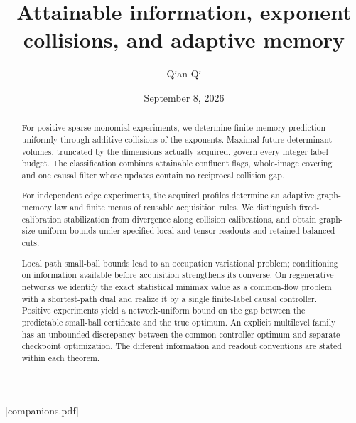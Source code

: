 
\providecommand{\upref}[2]{#1~\ref{#2}}
[companions.pdf]
\title[Attainable information and adaptive memory]{Attainable information, exponent collisions, and adaptive memory}
\author{Qian Qi}
\date{September 8, 2026}

\begin{abstract}
For positive sparse monomial experiments, we determine finite-memory
prediction uniformly through additive collisions of the exponents.
Maximal future determinant volumes, truncated by the dimensions actually
acquired, govern every integer label budget. The classification combines
attainable confluent flags, whole-image covering and one causal filter
whose updates contain no reciprocal collision gap.

For independent edge experiments, the acquired profiles determine an
adaptive graph-memory law and finite menus of reusable acquisition
rules. We distinguish fixed-calibration stabilization from divergence
along collision calibrations, and obtain graph-size-uniform bounds under
specified local-and-tensor readouts and retained balanced cuts.

Local path small-ball bounds lead to an occupation variational problem;
conditioning on information available before acquisition strengthens its
converse. On regenerative networks we identify the exact statistical
minimax value as a common-flow problem with a shortest-path dual and
realize it by a single finite-label causal controller. Positive
experiments yield a network-uniform bound on the gap between the
predictable small-ball certificate and the true optimum. An explicit
multilevel family has an unbounded discrepancy between the common
controller optimum and separate checkpoint optimization. The different
information and readout conventions are stated within each theorem.
\end{abstract}
\maketitle






